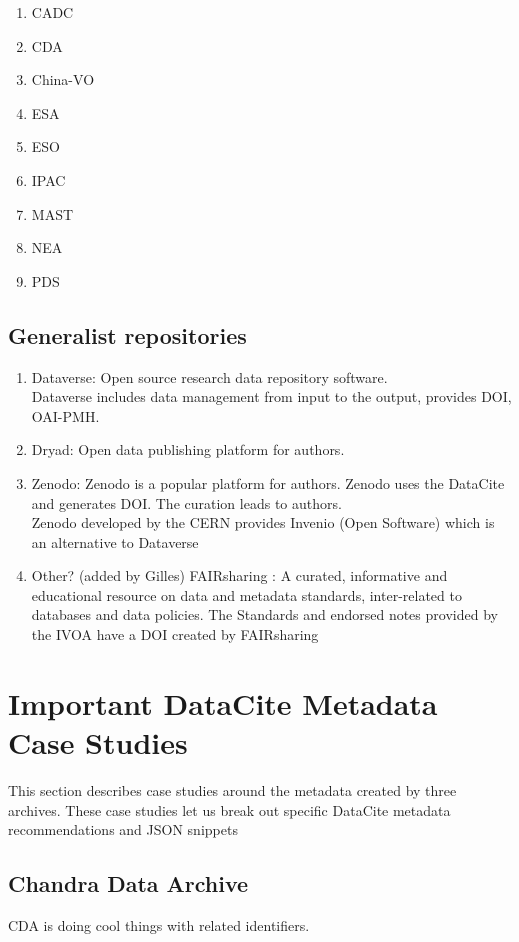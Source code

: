 \documentclass[11pt,a4paper]{ivoa}
\begin{document}
\begin{enumerate}
	\item CADC
	\item CDA
	\item China-VO
	\item ESA
	\item ESO
	\item IPAC
	\item MAST
	\item NEA
	\item PDS
\end{enumerate}

\subsection{Generalist repositories}

\begin{enumerate}
	\item Dataverse: Open source research data repository software.\\
	Dataverse includes data management from input to the output, provides DOI, OAI-PMH.
	\item Dryad: Open data publishing platform for authors.
	\item Zenodo: Zenodo is a popular platform for authors. Zenodo uses the DataCite and generates DOI. The curation leads to authors.\\
	Zenodo developed by the CERN provides Invenio (Open Software) which is an alternative to Dataverse 
	\item Other? {\color{red} (added by Gilles) FAIRsharing \cite{https://doi.org/10.25504/fairsharing.rd6gxr}: A curated, informative and educational resource on data and metadata standards, inter-related to databases and data policies. The Standards and endorsed notes provided by the IVOA have a DOI created by FAIRsharing}
\end{enumerate}


\section{Important DataCite Metadata Case Studies}
This section describes case studies around the metadata created by three archives. 
These case studies let us break out specific DataCite metadata recommendations and JSON snippets

\subsection{Chandra Data Archive}
CDA is doing cool things with related identifiers.
\end{document}
